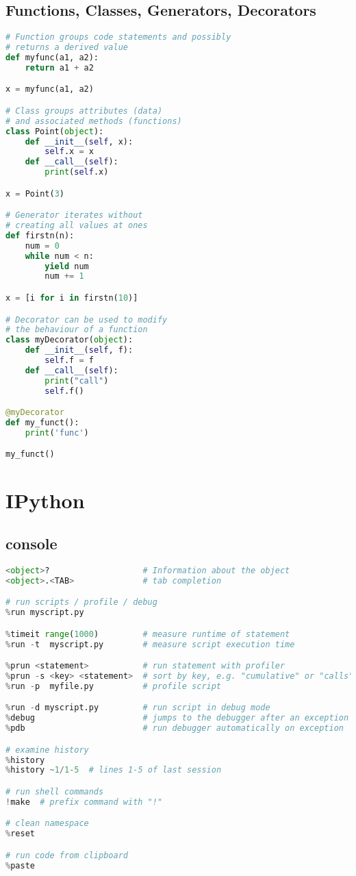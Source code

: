 \subsection{Functions, Classes, Generators,
Decorators}\label{functions-classes-generators-decorators}

\begin{lstlisting}[language=Python]
# Function groups code statements and possibly
# returns a derived value
def myfunc(a1, a2):
    return a1 + a2

x = myfunc(a1, a2)

# Class groups attributes (data)
# and associated methods (functions)
class Point(object):
    def __init__(self, x):
        self.x = x
    def __call__(self):
        print(self.x)

x = Point(3)

# Generator iterates without
# creating all values at ones
def firstn(n):
    num = 0
    while num < n:
        yield num
        num += 1

x = [i for i in firstn(10)]

# Decorator can be used to modify
# the behaviour of a function
class myDecorator(object):
    def __init__(self, f):
        self.f = f
    def __call__(self):
        print("call")
        self.f()

@myDecorator
def my_funct():
    print('func')

my_funct()
\end{lstlisting}

\section{IPython}\label{ipython}

\subsection{console}\label{console}

\begin{lstlisting}[language=Python]
<object>?                   # Information about the object
<object>.<TAB>              # tab completion

# run scripts / profile / debug
%run myscript.py

%timeit range(1000)         # measure runtime of statement
%run -t  myscript.py        # measure script execution time

%prun <statement>           # run statement with profiler
%prun -s <key> <statement>  # sort by key, e.g. "cumulative" or "calls"
%run -p  myfile.py          # profile script

%run -d myscript.py         # run script in debug mode
%debug                      # jumps to the debugger after an exception
%pdb                        # run debugger automatically on exception

# examine history
%history
%history ~1/1-5  # lines 1-5 of last session

# run shell commands
!make  # prefix command with "!"

# clean namespace
%reset

# run code from clipboard
%paste
\end{lstlisting}

